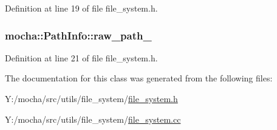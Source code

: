 Definition at line 19 of file file\_\-system.h.

\hypertarget{classmocha_1_1_path_info_afb72b77fb1aa4d7048e6885623246a8d}{
\subsubsection[{raw\_\-path\_\-}]{ {\bf mocha::PathInfo::raw\_\-path\_\-}}}
\label{classmocha_1_1_path_info_afb72b77fb1aa4d7048e6885623246a8d}


Definition at line 21 of file file\_\-system.h.



The documentation for this class was generated from the following files:\begin{DoxyCompactItemize}
\item 
Y:/mocha/src/utils/file\_\-system/\hyperlink{file__system_8h}{file\_\-system.h}\item 
Y:/mocha/src/utils/file\_\-system/\hyperlink{file__system_8cc}{file\_\-system.cc}\end{DoxyCompactItemize}
